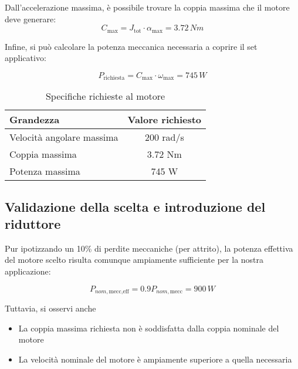 \documentclass[a4paper,12pt]{article}
\begin{document}
\vspace{0.5em}

Dall'accelerazione massima, è possibile trovare la coppia massima che il motore deve generare:
\[
    C_{\text{max}} = J_{\text{tot}} \cdot \alpha_{\text{max}} = 3.72 \,Nm
\]

\vspace{0.5em}
Infine, si può calcolare la potenza meccanica necessaria a coprire il set applicativo:

\[
    P_{\text{richiesta}} = C_{\text{max}} \cdot \omega_{\text{max}} = 745\,W
\]

\vspace{0.5cm}

\begin{table}[h!]
    \centering
    \begin{tabular}{|l|c|}
    \hline
    \textbf{Grandezza} & \textbf{Valore richiesto} \\ \hline
    Velocità angolare massima  & 200 rad/s\quad \\ \hline
    Coppia massima & 3.72 Nm\quad \\ \hline
    Potenza massima & 745 W\quad \\ \hline
    \end{tabular}
    \caption{Specifiche richieste al motore}
\end{table}


\subsection{Validazione della scelta e introduzione del riduttore}

Pur ipotizzando un 10\% di perdite meccaniche (per attrito), la potenza effettiva del motore scelto risulta comunque ampiamente sufficiente per la nostra applicazione:

\[
    P_{nom, \text{mecc,eff}} = 0.9 P_{nom, \text{mecc}}=900\,W
\]

\vspace{0.5cm}

Tuttavia, si osservi anche

\begin{itemize}
    \item La coppia massima richiesta non è soddisfatta dalla coppia nominale del motore
    \item La velocità nominale del motore è ampiamente superiore a quella necessaria
\end{itemize}

\vspace{0.5cm}
\end{document}
